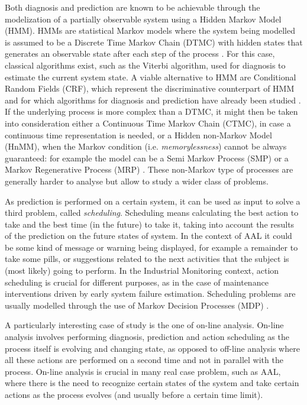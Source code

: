 \documentclass{article}
\begin{document}
        Both diagnosis and prediction are known to be achievable through the modelization of a partially observable system using a Hidden Markov Model (HMM). HMMs are statistical Markov models where the system being modelled is assumed to be a Discrete Time Markov Chain (DTMC) with hidden states that generates an observable state after each step of the process \cite{rabiner1986introduction}. For this case, classical algorithms exist, such as the Viterbi algorithm, used for diagnosis to estimate the current system state. A viable alternative to HMM are Conditional Random Fields (CRF), which represent the discriminative counterpart of HMM and for which algorithms for diagnosis and prediction have already been studied \cite{lafferty2001conditional}. If the underlying process is more complex than a DTMC, it might then be taken into consideration either a Continuous Time Markov Chain (CTMC), in case a continuous time representation is needed, or a Hidden non-Markov Model (HnMM), when the Markov condition (i.e. \textit{memorylessness}) cannot be always guaranteed: for example the model can be a Semi Markov Process (SMP) \cite{lipsky2009semi} or a Markov Regenerative Process (MRP) \cite{logothetis1995markov}. These non-Markov type of processes are generally harder to analyse but allow to study a wider class of problems.
        
        As prediction is performed on a certain system, it can be used as input to solve a third problem, called \textit{scheduling}. Scheduling means calculating the best action to take and the best time (in the future) to take it, taking into account the results of the prediction on the future states of system. In the context of AAL it could be some kind of message or warning being displayed, for example a remainder to take some pills, or suggestions related to the next activities that the subject is (most likely) going to perform. In the Industrial Monitoring context, action scheduling is crucial for different purposes, as in the case of maintenance interventions driven by early system failure estimation. Scheduling problems are usually modelled through the use of Markov Decision Processes (MDP) \cite{puterman2014markov, baier2005efficient}.
        
        A particularly interesting case of study is the one of on-line analysis. On-line analysis involves performing diagnosis, prediction and action scheduling as the process itself is evolving and changing state, as opposed to off-line analysis where all these actions are performed on a second time and not in parallel with the process. On-line analysis is crucial in many real case problem, such as AAL, where there is the need to recognize certain states of the system and take certain actions as the process evolves (and usually before a certain time limit).
    
\end{document}
